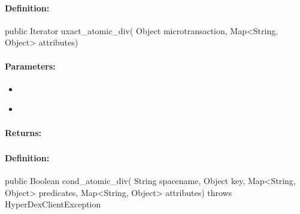 \paragraph{Definition:}
\begin{javacode}
public Iterator uxact_atomic_div(
        Object microtransaction,
        Map<String, Object> attributes)
\end{javacode}

\paragraph{Parameters:}
\begin{itemize}[noitemsep]
\item {}\\

\item {}\\

\end{itemize}

\paragraph{Returns:}


\pagebreak
\subsubsection{}
\label{api:java:cond_atomic_div}


\paragraph{Definition:}
\begin{javacode}
public Boolean cond_atomic_div(
        String spacename,
        Object key,
        Map<String, Object> predicates,
        Map<String, Object> attributes) throws HyperDexClientException
\end{javacode}

